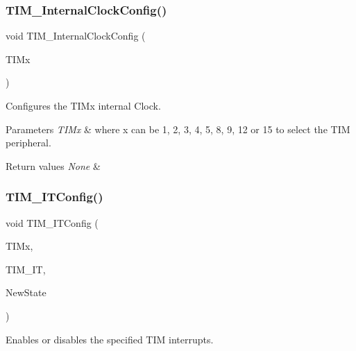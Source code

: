 \subsubsection{\texorpdfstring{TIM\_InternalClockConfig()}{TIM\_InternalClockConfig()}}
{\footnotesize\ttfamily void T\+I\+M\+\_\+\+Internal\+Clock\+Config (\begin{DoxyParamCaption}\item[{\mbox{\hyperlink{struct_t_i_m___type_def}{T\+I\+M\+\_\+\+Type\+Def}} $\ast$}]{T\+I\+Mx }\end{DoxyParamCaption})}



Configures the T\+I\+Mx internal Clock. 


\begin{DoxyParams}{Parameters}
{\em T\+I\+Mx} & where x can be 1, 2, 3, 4, 5, 8, 9, 12 or 15 to select the T\+IM peripheral. \\
\hline
\end{DoxyParams}

\begin{DoxyRetVals}{Return values}
{\em None} & \\
\hline
\end{DoxyRetVals}
\mbox{\label{group___t_i_m___exported___functions_ga70e3d6c09d55ee69002e154c85cd40e4}} 
\subsubsection{\texorpdfstring{TIM\_ITConfig()}{TIM\_ITConfig()}}
{\footnotesize\ttfamily void T\+I\+M\+\_\+\+I\+T\+Config (\begin{DoxyParamCaption}\item[{\mbox{\hyperlink{struct_t_i_m___type_def}{T\+I\+M\+\_\+\+Type\+Def}} $\ast$}]{T\+I\+Mx,  }\item[{uint16\+\_\+t}]{T\+I\+M\+\_\+\+IT,  }\item[{\mbox{\hyperlink{group___exported__types_gac9a7e9a35d2513ec15c3b537aaa4fba1}{Functional\+State}}}]{New\+State }\end{DoxyParamCaption})}



Enables or disables the specified T\+IM interrupts. 



